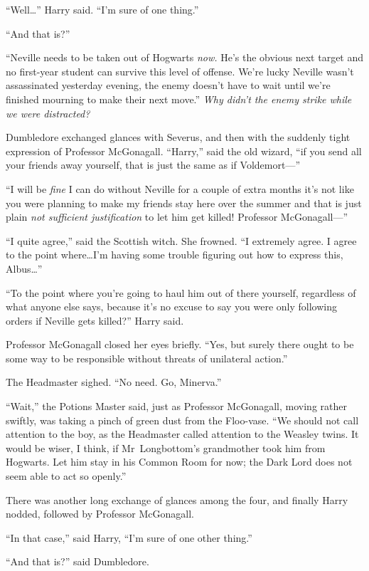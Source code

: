 “Well…” Harry said. “I’m sure of one thing.”

“And that is?”

“Neville needs to be taken out of Hogwarts \emph{now.} He’s the obvious next target and no first-year student can survive this level of offense. We’re lucky Neville wasn’t assassinated yesterday evening, the enemy doesn’t have to wait until we’re finished mourning to make their next move.” \emph{Why didn’t the enemy strike while we were distracted?}

Dumbledore exchanged glances with Severus, and then with the suddenly tight expression of Professor McGonagall. “Harry,” said the old wizard, “if you send all your friends away yourself, that is just the same as if Voldemort—”

“I will be \emph{fine} I can do without Neville for a couple of extra months it’s not like you were planning to make my friends stay here over the summer and that is just plain \emph{not sufficient justification} to let him get killed! Professor McGonagall—”

“I quite agree,” said the Scottish witch. She frowned. “I extremely agree. I agree to the point where…I’m having some trouble figuring out how to express this, Albus…”

“To the point where you’re going to haul him out of there yourself, regardless of what anyone else says, because it’s no excuse to say you were only following orders if Neville gets killed?” Harry said.

Professor McGonagall closed her eyes briefly. “Yes, but surely there ought to be some way to be responsible without threats of unilateral action.”

The Headmaster sighed. “No need. Go, Minerva.”

“Wait,” the Potions Master said, just as Professor McGonagall, moving rather swiftly, was taking a pinch of green dust from the Floo-vase. “We should not call attention to the boy, as the Headmaster called attention to the Weasley twins. It would be wiser, I think, if Mr~Longbottom’s grandmother took him from Hogwarts. Let him stay in his Common Room for now; the Dark Lord does not seem able to act so openly.”

There was another long exchange of glances among the four, and finally Harry nodded, followed by Professor McGonagall.

“In that case,” said Harry, “I’m sure of one other thing.”

“And that is?” said Dumbledore.

